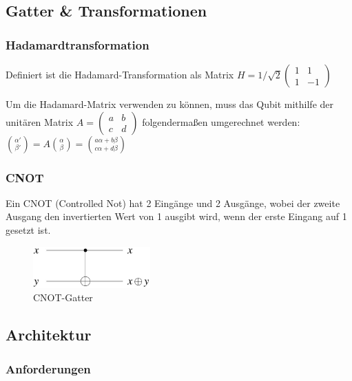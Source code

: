 \subsection{Gatter \& Transformationen}
\label{sec:Gatter u Transformationen}

\subsubsection{Hadamardtransformation}
\label{sec:Hadamardtransformation}

Definiert ist die Hadamard-Transformation als Matrix 
$H = 1/\sqrt{2}
\begin{pmatrix}
    1 &  1 \\
    1 & -1
\end{pmatrix}$

Um die Hadamard-Matrix verwenden zu können, muss das Qubit mithilfe der unitären Matrix
$A = \begin{pmatrix} 
    a & b \\
    c & d 
\end{pmatrix}$
folgendermaßen umgerechnet werden: $\binom{\alpha'}{\beta'} = A \binom{\alpha}{\beta} = {\binom{a\alpha + b\beta}{c\alpha + d\beta}}$


\subsubsection{CNOT}
\label{sec:CNOT}

Ein CNOT (Controlled Not) hat 2 Eingänge und 2 Ausgänge, wobei der zweite Ausgang den invertierten Wert von 1 ausgibt wird, wenn der erste Eingang auf 1 gesetzt ist.

\begin{figure}[!htb]
	\centering\includegraphics[width=0.4\textwidth]{images/cnot.jpg}
	\caption{CNOT-Gatter}
	\label{cnot}
\end{figure}


\subsection{Architektur}
\label{sec:Architektur}

\subsubsection{Anforderungen}
\label{sec:Anforderungen}

